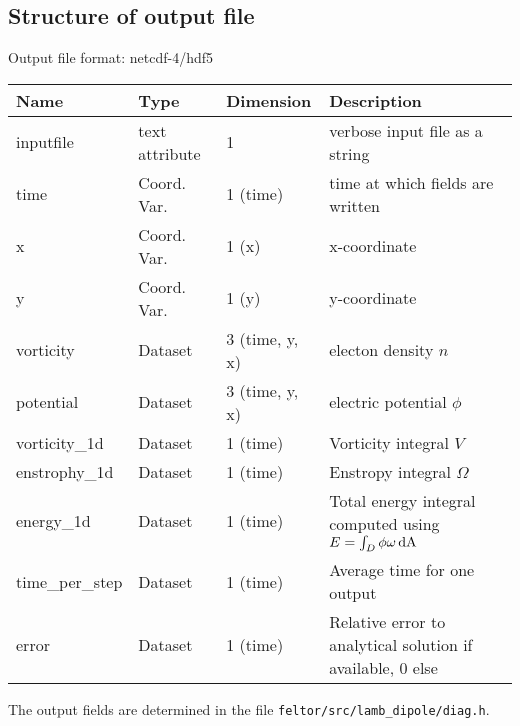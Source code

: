 \subsection{Structure of output file}
Output file format: netcdf-4/hdf5
%
\begin{longtable}{lll>{\RaggedRight}p{7cm}}
\toprule
\rowcolor{gray!50}\textbf{Name} &  \textbf{Type} & \textbf{Dimension} & \textbf{Description}  \\ \midrule
inputfile  &             text attribute & 1 & verbose input file as a string \\
time                     & Coord. Var. & 1 (time) & time at which fields are written \\
x                        & Coord. Var. & 1 (x) & x-coordinate  \\
y                        & Coord. Var. & 1 (y) & y-coordinate \\
vorticity                & Dataset & 3 (time, y, x) & electon density $n$ \\
potential                & Dataset & 3 (time, y, x) & electric potential $\phi$  \\
vorticity\_1d            & Dataset & 1 (time) & Vorticity integral $V$  \\
enstrophy\_1d            & Dataset & 1 (time) & Enstropy integral $\Omega$  \\
energy\_1d               & Dataset & 1 (time) & Total energy integral computed using $E = \int_D \phi\omega \,\mathrm{dA}$ \\
time\_per\_step          & Dataset & 1 (time) & Average time for one output \\
error                    & Dataset & 1 (time) & Relative error to analytical solution if available, 0 else \\
\bottomrule
\end{longtable}
The output fields are determined in the file \texttt{feltor/src/lamb\_dipole/diag.h}.





